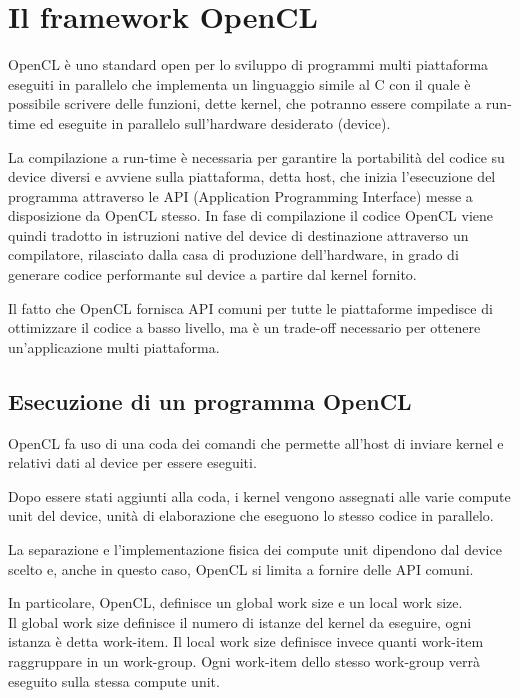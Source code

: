 \chapter{Il framework OpenCL}
\vspace{4cm}
OpenCL è uno standard open per lo sviluppo di programmi multi piattaforma eseguiti in parallelo che implementa un linguaggio simile al C con il quale è possibile scrivere delle funzioni, dette kernel, che potranno essere compilate a run-time ed eseguite in parallelo sull'hardware desiderato (device).

La compilazione a run-time è necessaria per garantire la portabilità del codice su device diversi e avviene sulla piattaforma, detta host, che inizia l'esecuzione del programma attraverso le API (Application Programming Interface) messe a disposizione da OpenCL stesso.
In fase di compilazione il codice OpenCL viene quindi tradotto in istruzioni native del device di destinazione attraverso un compilatore, rilasciato dalla casa di produzione dell'hardware, in grado di generare codice performante sul device a partire dal kernel fornito.

Il fatto che OpenCL fornisca API comuni per tutte le piattaforme impedisce di ottimizzare il codice a basso livello, ma è un trade-off necessario per ottenere un'applicazione multi piattaforma.

\section{Esecuzione di un programma OpenCL}
OpenCL fa uso di una coda dei comandi che permette all'host di inviare kernel e relativi dati al device per essere eseguiti.

Dopo essere stati aggiunti alla coda, i kernel vengono assegnati alle varie compute unit del device, unità di elaborazione che eseguono lo stesso codice in parallelo.
 
La separazione e l'implementazione fisica dei compute unit dipendono dal device scelto e, anche in questo caso, OpenCL si limita a fornire delle API comuni.

In particolare, OpenCL, definisce un global work size e un local work size. \\
Il global work size definisce il numero di istanze del kernel da eseguire, ogni istanza è detta work-item.
Il local work size definisce invece quanti work-item raggruppare in un work-group. Ogni work-item dello stesso work-group verrà eseguito sulla stessa compute unit.

